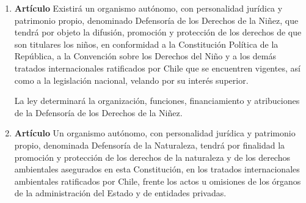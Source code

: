 \documentclass[11pt, a4paper]{article}
\begin{document}
\begin{enumerate}
\item \textbf{Artículo} \newline
Existirá un organismo autónomo, con personalidad jurídica y patrimonio propio, denominado Defensoría de los Derechos de la Niñez, que tendrá por objeto la difusión, promoción y protección de los derechos de que son titulares los niños, en conformidad a la Constitución Política de la República, a la Convención sobre los Derechos del Niño y a los demás tratados internacionales ratificados por Chile que se encuentren vigentes, así como a la legislación nacional, velando por su interés superior. 

La ley determinará la organización, funciones, financiamiento y atribuciones de la Defensoría de los Derechos de la Niñez. 


\item \textbf{Artículo} \newline
Un organismo autónomo, con personalidad jurídica y patrimonio propio, denominada Defensoría de la Naturaleza, tendrá por finalidad la promoción y protección de los derechos de la naturaleza y de los derechos ambientales asegurados en esta Constitución, en los tratados internacionales ambientales ratificados por Chile, frente los actos u omisiones de los órganos de la administración del Estado y de entidades privadas. 


\end{enumerate}
\end{document}

